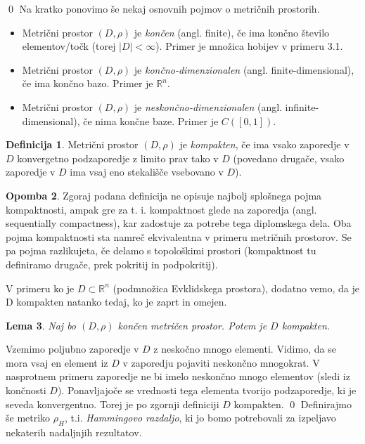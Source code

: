 \documentclass[12pt,a4paper]{amsart}
\theoremstyle{definition} %
\newtheorem{definicija}{Definicija}[section]
\newtheorem{opomba}[definicija]{Opomba}
\theoremstyle{plain} %
\newtheorem{lema}[definicija]{Lema}
\begin{document}
\qed
\newline
\newline
Na kratko ponovimo še nekaj osnovnih pojmov o metričnih prostorih.
\begin{itemize}
\item Metrični prostor $(D, \rho)$ je \textit{končen} (angl. finite), če ima končno število elementov/točk (torej $|D| < \infty$). Primer je množica hobijev v primeru 3.1.
\item Metrični prostor $(D, \rho)$ je \textit{končno-dimenzionalen} (angl. finite-dimensional), če ima končno bazo. Primer je $\mathbb{R}^n$.
\item Metrični prostor $(D, \rho)$ je \textit{neskončno-dimenzionalen} (angl. infinite-dimensional), če nima končne baze. Primer je $C([0,1])$.
\end{itemize}
\begin{definicija}
Metrični prostor $(D, \rho)$ je \textit{kompakten}, če ima vsako zaporedje v $D$ konvergetno podzaporedje z limito prav tako v $D$ (povedano drugače, vsako zaporedje v $D$ ima vsaj eno stekališče vsebovano v $D$).
\end{definicija}
\begin{opomba}
Zgoraj podana definicija ne opisuje najbolj splošnega pojma kompaktnosti, ampak gre za  t. i. kompaktnost glede na zaporedja (angl. sequentially compactness), kar zadostuje za potrebe tega diplomskega dela. Oba pojma kompaktnosti sta namreč ekvivalentna v primeru metričnih prostorov. Se pa pojma razlikujeta, če delamo s topološkimi prostori (kompaktnost tu definiramo drugače, prek pokritij in podpokritij).
\end{opomba}
V primeru ko je $D \subset \mathbb{R}^n$ (podmnožica Evklidskega prostora), dodatno vemo, da je D kompakten natanko tedaj, ko je zaprt in omejen.
\begin{lema}
Naj bo $(D, \rho)$ končen metričen prostor. Potem je $D$ kompakten.
\end{lema}
\proof
Vzemimo poljubno zaporedje v $D$ z neskočno mnogo elementi. Vidimo, da se mora vsaj en element iz $D$ v zaporedju pojaviti neskončno mnogokrat. V nasprotnem primeru zaporedje ne bi imelo neskončno mnogo elementov (sledi iz končnosti $D$). Ponavljajoče se vrednosti tega elementa tvorijo podzaporedje, ki je seveda konvergentno. Torej je po zgornji definiciji $D$ kompakten.
\qed
\newline
\newline
Definirajmo še metriko $\rho_H$, t.i. \textit{Hammingovo razdaljo}, ki jo bomo potrebovali za izpeljavo nekaterih nadaljnjih rezultatov. 
\end{document}
